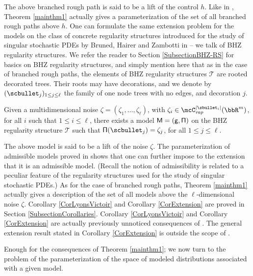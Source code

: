 The above branched rough path is said to be a lift of the control $h$. Like in \cite{TZ18}, Theorem \ref{mainthm1} actually gives a parameterization of the set of all branched rough paths above $h$. One can formulate the same extension problem for the models on the class of concrete regularity structures introduced for the study of singular stochastic PDEs by Bruned, Hairer and Zambotti in \cite{BHZ} -- we talk of BHZ regularity structures. We refer the reader to Section \ref{SubsectionBHZ-RS} for basics on BHZ regularity structures, and simply mention here that as in the case of branched rough paths, the elements of BHZ regularity structures $\mathscr{T}$ are rooted decorated trees. Their roots may have decorations, and we denote by $(\scbullet_j)_{1\leq j\leq \ell}$ the family of one node trees with no edges, and decoration $j$.

\begin{cor} \label{CorExtension}
Given a multidimensional noise $\zeta=(\zeta_1,\dots,\zeta_\ell)$, with $\zeta_i\in \mcC^{\vert\sbullet_i\vert}_\textrm{\emph{rap}}(\bbR^m)$, for all $i$ such that $1\leq i\leq\ell$, there exists a model $\sf M=(g,\Pi)$ on the BHZ regularity structure $\mathscr{T}$ such that ${\sf \Pi}(\scbullet_j)=\zeta_j$, for all $1\leq j\leq\ell$.
\end{cor}

The above model is said to be a lift of the noise $\zeta$. The parameterization of admissible models proved in \cite{BH} shows that one can further impose to the extension that it is an admissible model. (Recall the notion of admissibility is related to a peculiar feature of the regularity structures used for the study of singular stochastic PDEs.) As for the case of branched rough paths, Theorem \ref{mainthm1} actually gives a description of the set of all models above the $\ell$-dimensional noise $\zeta$. Corollary \ref{CorLyonsVictoir} and Corollary \ref{CorExtension} are proved in Section \ref{SubsectionCorollaries}. Corollary \ref{CorLyonsVictoir} and Corollary \ref{CorExtension} are actually previously unnoticed consequences of \cite[Th.\,21]{BH}. The general extension result stated in Corollary \ref{CorExtension} is outside the scope of \cite[Th.\,21]{BH}.

Enough for the consequences of Theorem \ref{mainthm1}; we now turn to the problem of the parameterization of the space of modeled distributions associated with a given model.

